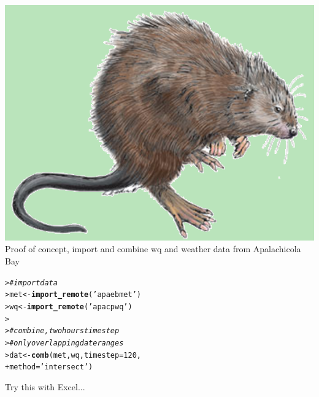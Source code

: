 \documentclass[serif]{beamer}\usepackage[]{graphicx}\usepackage[]{color}
\makeatletter
\newcommand{\hlnum}[1]{\textcolor[rgb]{0.686,0.059,0.569}{#1}}%
\newcommand{\hlstr}[1]{\textcolor[rgb]{0.192,0.494,0.8}{#1}}%
\newcommand{\hlcom}[1]{\textcolor[rgb]{0.678,0.584,0.686}{\textit{#1}}}%
\newcommand{\hlstd}[1]{\textcolor[rgb]{0.345,0.345,0.345}{#1}}%
\newcommand{\hlkwb}[1]{\textcolor[rgb]{0.69,0.353,0.396}{#1}}%
\newcommand{\hlkwc}[1]{\textcolor[rgb]{0.333,0.667,0.333}{#1}}%
\newcommand{\hlkwd}[1]{\textcolor[rgb]{0.737,0.353,0.396}{\textbf{#1}}}%
\newenvironment{kframe}{%
 \def\at@end@of@kframe{}%
 \ifinner\ifhmode%
  \def\at@end@of@kframe{\end{minipage}}%
  \begin{minipage}{\columnwidth}%
 \fi\fi%
 \def\FrameCommand##1{\hskip\@totalleftmargin \hskip-\fboxsep
 \colorbox{shadecolor}{##1}\hskip-\fboxsep
     \hskip-\linewidth \hskip-\@totalleftmargin \hskip\columnwidth}%
 \MakeFramed {\advance\hsize-\width
   \@totalleftmargin\z@ \linewidth\hsize
   \@setminipage}}%
 {\par\unskip\endMakeFramed%
 \at@end@of@kframe}
\newenvironment{knitrout}{}{} %
\makeatother
\begin{document}
\begin{frame}[fragile]{\includegraphics[width=0.05\paperwidth]{fig/muskrat.png}\hspace{0.07in}{\bf SWMPrats.net: The SWMPr package}}
Proof of concept, import and combine wq and weather data from Apalachicola Bay
\begin{knitrout}
\color{fgcolor}\begin{kframe}
\begin{alltt}
\hlstd{> }\hlcom{# import data}
\hlstd{> }\hlstd{met} \hlkwb{<-} \hlkwd{import_remote}\hlstd{(}\hlstr{'apaebmet'}\hlstd{)}
\hlstd{> }\hlstd{wq} \hlkwb{<-} \hlkwd{import_remote}\hlstd{(}\hlstr{'apacpwq'}\hlstd{)}
\hlstd{> }
\hlstd{> }\hlcom{# combine, two hours time step}
\hlstd{> }\hlcom{# only overlapping date ranges}
\hlstd{> }\hlstd{dat} \hlkwb{<-} \hlkwd{comb}\hlstd{(met, wq,} \hlkwc{timestep} \hlstd{=} \hlnum{120}\hlstd{,}
\hlstd{+ }  \hlkwc{method} \hlstd{=} \hlstr{'intersect'}\hlstd{)}
\end{alltt}
\end{kframe}
\end{knitrout}
Try this with Excel...
\end{frame}
\end{document}
